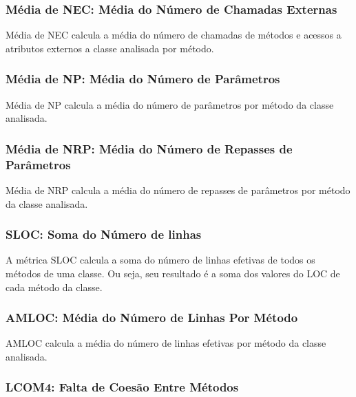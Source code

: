         

\subsubsection{Média de NEC: Média do Número de Chamadas Externas}
         
	Média de NEC calcula a média do número de chamadas de métodos e acessos a atributos externos a classe analisada por método.


\subsubsection{Média de NP: Média do Número de Parâmetros}

	Média de NP calcula a média do número de parâmetros por método da classe analisada.
	   


\subsubsection{Média de NRP: Média do Número de Repasses de Parâmetros}        

	Média de NRP calcula a média do número de repasses de parâmetros por método da classe analisada.


                                                        
\subsubsection{SLOC: Soma do Número de linhas}
                                          
	A métrica SLOC calcula a soma do número de linhas efetivas de todos os métodos de uma classe. Ou seja, seu resultado é a soma dos valores do LOC de cada método da classe.



\subsubsection{AMLOC: Média do Número de Linhas Por Método}
                                   
	AMLOC calcula a média do número de linhas efetivas por método da classe analisada.
	


\subsubsection{LCOM4: Falta de Coesão Entre Métodos}
    
